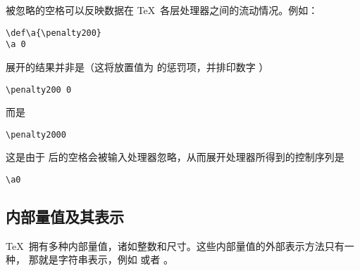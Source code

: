 \documentclass{book}
\begin{document}
被忽略的空格可以反映数据在 \TeX\ 各层处理器之间的流动情况。例如：
\begin{verbatim}
\def\a{\penalty200}
\a 0
\end{verbatim} 
展开的结果{\italic 并非}是（这将放置值为  的惩罚项，并排印数字 ）
\begin{verbatim}
\penalty200 0
\end{verbatim} 
而是
\begin{verbatim}
\penalty2000
\end{verbatim}
这是由于  后的空格会被输入处理器忽略，从而展开处理器所得到的控制序列是
\begin{verbatim}
\a0
\end{verbatim}

\subsection{内部量值及其表示}

\TeX\ 拥有多种内部量值，诸如整数和尺寸。这些内部量值的外部表示方法只有一种，
那就是字符串表示，例如  或者 \n{91.44cm}。
\end{document}
